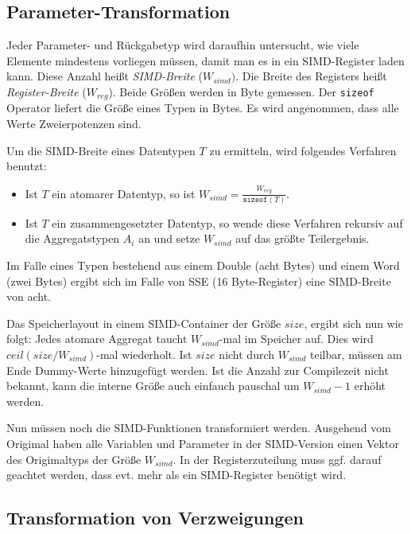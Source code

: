 \documentclass[a4paper,10pt]{article}
\begin{document}
\subsection{Parameter-Transformation}

Jeder Parameter- und Rückgabetyp wird daraufhin untersucht, wie viele Elemente mindestens vorliegen
müssen, damit man es in ein SIMD-Register laden kann. Diese Anzahl heißt \emph{SIMD-Breite}
($W_{simd})$. Die Breite des Registers heißt \emph{Register-Breite} ($W_{reg}$). Beide Größen werden
in Byte gemessen. Der \texttt{sizeof} Operator liefert die Größe eines Typen in Bytes. Es wird
angenommen, dass alle Werte Zweierpotenzen sind.

Um die SIMD-Breite eines Datentypen $T$ zu ermitteln, wird folgendes Verfahren benutzt:

\begin{itemize}

    \item Ist $T$ ein atomarer Datentyp, so ist $W_{simd} = \frac{W_{reg}}{\texttt{sizeof}(T)}$.

    \item Ist $T$ ein zusammengesetzter Datentyp, so wende diese Verfahren rekursiv auf die
    Aggregatstypen $A_i$ an und setze $W_{simd}$ auf das größte Teilergebnis.

\end{itemize}

Im Falle eines Typen bestehend aus einem Double (acht Bytes) und einem Word (zwei Bytes) ergibt sich
im Falle von SSE (16 Byte-Register) eine SIMD-Breite von acht.

Das Speicherlayout in einem SIMD-Container der Größe $size$, ergibt sich nun wie folgt: Jedes
atomare Aggregat taucht $W_{simd}$-mal im Speicher auf. Dies wird $ceil(size/W_{simd})$-mal
wiederholt.  Ist $size$ nicht durch $W_{simd}$ teilbar, müssen am Ende Dummy-Werte hinzugefügt
werden. Ist die Anzahl zur Compilezeit nicht bekannt, kann die interne Größe auch einfauch pauschal
um $W_{simd}-1$ erhöht werden. 

Nun müssen noch die SIMD-Funktionen transformiert werden. Ausgehend vom Origimal haben alle
Variablen und Parameter in der SIMD-Version einen Vektor des Origimaltyps der Größe $W_{simd}$. In
der Registerzuteilung muss ggf. darauf geachtet werden, dass evt. mehr als ein SIMD-Register
benötigt wird.

\subsection{Transformation von Verzweigungen}
\end{document}
